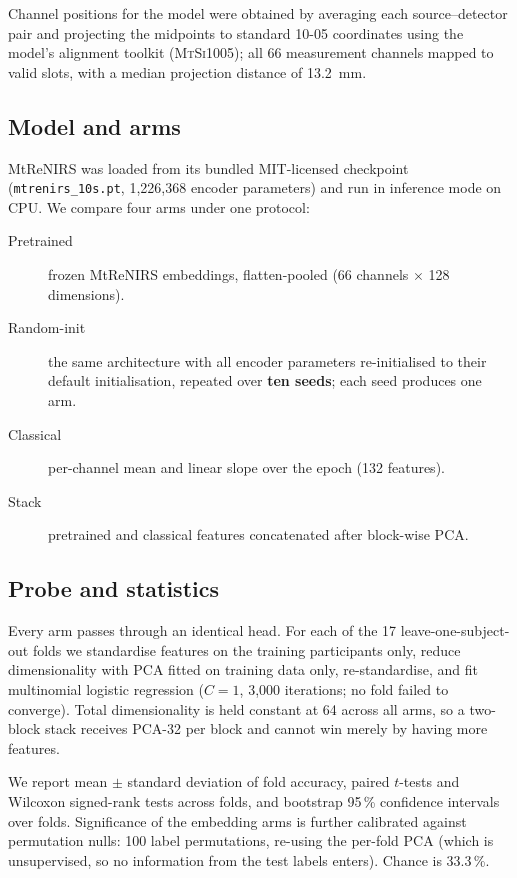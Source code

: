 Channel positions for the model were obtained by averaging each source--detector pair and
projecting the midpoints to standard 10-05 coordinates using the model's alignment toolkit
(\textsc{MtSi1005}); all 66 measurement channels mapped to valid slots, with a median projection
distance of 13.2~mm.

\subsection{Model and arms}
MtReNIRS was loaded from its bundled MIT-licensed checkpoint (\texttt{mtrenirs\_10s.pt},
1{,}226{,}368 encoder parameters) and run in inference mode on CPU. We compare four arms under
one protocol:
\begin{description}
  \item[Pretrained] frozen MtReNIRS embeddings, flatten-pooled (66 channels $\times$ 128
        dimensions).
  \item[Random-init] the same architecture with all encoder parameters re-initialised to their
        default initialisation, repeated over \textbf{ten seeds}; each seed produces one arm.
  \item[Classical] per-channel mean and linear slope over the epoch (132 features).
  \item[Stack] pretrained and classical features concatenated after block-wise PCA.
\end{description}

\subsection{Probe and statistics}
Every arm passes through an identical head. For each of the 17 leave-one-subject-out folds we
standardise features on the training participants only, reduce dimensionality with PCA fitted on
training data only, re-standardise, and fit multinomial logistic regression ($C=1$, 3{,}000
iterations; no fold failed to converge). Total dimensionality is held constant at 64 across all
arms, so a two-block stack receives PCA-32 per block and cannot win merely by having more
features.

We report mean $\pm$ standard deviation of fold accuracy, paired $t$-tests and Wilcoxon
signed-rank tests across folds, and bootstrap 95\,\% confidence intervals over folds.
Significance of the embedding arms is further calibrated against permutation nulls: 100 label
permutations, re-using the per-fold PCA (which is unsupervised, so no information from the test
labels enters). Chance is 33.3\,\%.

